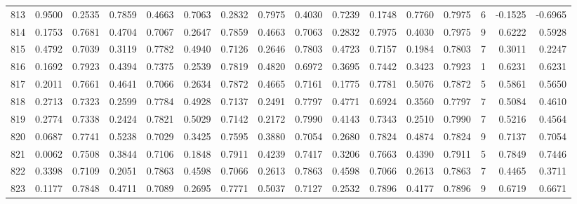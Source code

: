 \begin{tabular}{lrrrrrrrrrrrrrrr}
813 &      0.9500 &  0.2535 &  0.7859 &  0.4663 &  0.7063 &  0.2832 &  0.7975 &  0.4030 &  0.7239 &  0.1748 &   0.7760 &     0.7975 &      6 &                   -0.1525 &                    -0.6965 \\
814 &      0.1753 &  0.7681 &  0.4704 &  0.7067 &  0.2647 &  0.7859 &  0.4663 &  0.7063 &  0.2832 &  0.7975 &   0.4030 &     0.7975 &      9 &                    0.6222 &                     0.5928 \\
815 &      0.4792 &  0.7039 &  0.3119 &  0.7782 &  0.4940 &  0.7126 &  0.2646 &  0.7803 &  0.4723 &  0.7157 &   0.1984 &     0.7803 &      7 &                    0.3011 &                     0.2247 \\
816 &      0.1692 &  0.7923 &  0.4394 &  0.7375 &  0.2539 &  0.7819 &  0.4820 &  0.6972 &  0.3695 &  0.7442 &   0.3423 &     0.7923 &      1 &                    0.6231 &                     0.6231 \\
817 &      0.2011 &  0.7661 &  0.4641 &  0.7066 &  0.2634 &  0.7872 &  0.4665 &  0.7161 &  0.1775 &  0.7781 &   0.5076 &     0.7872 &      5 &                    0.5861 &                     0.5650 \\
818 &      0.2713 &  0.7323 &  0.2599 &  0.7784 &  0.4928 &  0.7137 &  0.2491 &  0.7797 &  0.4771 &  0.6924 &   0.3560 &     0.7797 &      7 &                    0.5084 &                     0.4610 \\
819 &      0.2774 &  0.7338 &  0.2424 &  0.7821 &  0.5029 &  0.7142 &  0.2172 &  0.7990 &  0.4143 &  0.7343 &   0.2510 &     0.7990 &      7 &                    0.5216 &                     0.4564 \\
820 &      0.0687 &  0.7741 &  0.5238 &  0.7029 &  0.3425 &  0.7595 &  0.3880 &  0.7054 &  0.2680 &  0.7824 &   0.4874 &     0.7824 &      9 &                    0.7137 &                     0.7054 \\
821 &      0.0062 &  0.7508 &  0.3844 &  0.7106 &  0.1848 &  0.7911 &  0.4239 &  0.7417 &  0.3206 &  0.7663 &   0.4390 &     0.7911 &      5 &                    0.7849 &                     0.7446 \\
822 &      0.3398 &  0.7109 &  0.2051 &  0.7863 &  0.4598 &  0.7066 &  0.2613 &  0.7863 &  0.4598 &  0.7066 &   0.2613 &     0.7863 &      7 &                    0.4465 &                     0.3711 \\
823 &      0.1177 &  0.7848 &  0.4711 &  0.7089 &  0.2695 &  0.7771 &  0.5037 &  0.7127 &  0.2532 &  0.7896 &   0.4177 &     0.7896 &      9 &                    0.6719 &                     0.6671 \\

\end{tabular}
